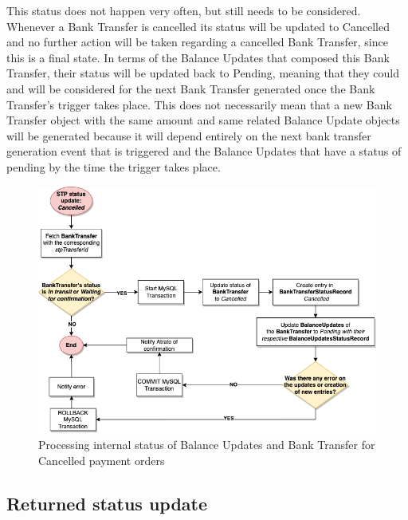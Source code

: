 This status does not happen very often, but still needs to be considered. Whenever a Bank Transfer is cancelled its status will be updated to Cancelled and no further action will be taken regarding a cancelled Bank Transfer, since this is a final state. In terms of the Balance Updates that composed this Bank Transfer, their status will be updated back to Pending, meaning that they could and will be considered for the next Bank Transfer generated once the Bank Transfer’s trigger takes place. 
This does not necessarily mean that a new Bank Transfer object with the same amount and same related Balance Update objects will be generated because it will depend entirely on the next bank transfer generation event that is triggered and the Balance Updates that have a status of pending by the time the trigger takes place. 


\begin{figure} [h]
    \centering
    \includegraphics[scale = 0.4]{assets/diagrams/CancelledStatusUpdate.png}
    \caption{Processing internal status of Balance Updates and Bank Transfer for Cancelled payment orders}\label{fig:cancelled_status_update}
\end{figure}

\subsection{Returned status update}

